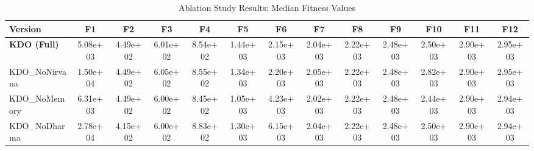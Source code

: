 \begin{table}[htbp]
\centering\small
\caption{Ablation Study Results: Median Fitness Values}
\label{tab:ablation}
\begin{tabular}{lcccccccccccc}
\toprule
\textbf{Version} & \textbf{F1} & \textbf{F2} & \textbf{F3} & \textbf{F4} & \textbf{F5} & \textbf{F6} & \textbf{F7} & \textbf{F8} & \textbf{F9} & \textbf{F10} & \textbf{F11} & \textbf{F12} \\
\midrule
\textbf{KDO (Full)} & 5.08e+03 & 4.49e+02 & 6.01e+02 & 8.54e+02 & 1.44e+03 & 2.15e+03 & 2.04e+03 & 2.22e+03 & 2.48e+03 & 2.50e+03 & 2.90e+03 & 2.95e+03 \\
KDO_NoNirvana & 1.50e+04 & 4.49e+02 & 6.05e+02 & 8.55e+02 & 1.34e+03 & 2.20e+03 & 2.05e+03 & 2.22e+03 & 2.48e+03 & 2.82e+03 & 2.90e+03 & 2.95e+03 \\
KDO_NoMemory & 6.31e+03 & 4.49e+02 & 6.00e+02 & 8.45e+02 & 1.05e+03 & 4.23e+03 & 2.02e+03 & 2.22e+03 & 2.48e+03 & 2.44e+03 & 2.90e+03 & 2.94e+03 \\
KDO_NoDharma & 2.78e+04 & 4.15e+02 & 6.00e+02 & 8.83e+02 & 1.30e+03 & 6.15e+03 & 2.04e+03 & 2.22e+03 & 2.48e+03 & 2.50e+03 & 2.90e+03 & 2.94e+03 \\
\bottomrule
\end{tabular}
\end{table}
